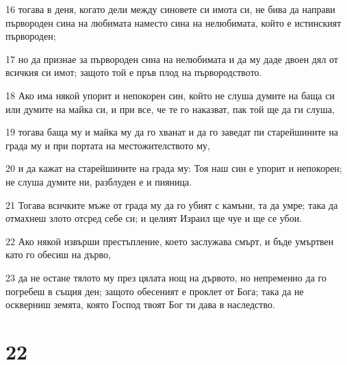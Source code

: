 \par 16 тогава в деня, когато дели между синовете си имота си, не бива да направи първороден сина на любимата наместо сина на нелюбимата, който е истинският първороден;
\par 17 но да признае за първороден сина на нелюбимата и да му даде двоен дял от всичкия си имот; защото той е пръв плод на първородството.
\par 18 Ако има някой упорит и непокорен син, който не слуша думите на баща си или думите на майка си, и при все, че те го наказват, пак той ще да ги слуша,
\par 19 тогава баща му и майка му да го хванат и да го заведат пи старейшините на града му и при портата на местожителството му,
\par 20 и да кажат на старейшините на града му: Тоя наш син е упорит и непокорен; не слуша думите ни, разблуден е и пияница.
\par 21 Тогава всичките мъже от града му да го убият с камъни, та да умре; така да отмахнеш злото отсред себе си; и целият Израил ще чуе и ще се убои.
\par 22 Ако някой извърши престъпление, което заслужава смърт, и бъде умъртвен като го обесиш на дърво,
\par 23 да не остане тялото му през цялата нощ на дървото, но непременно да го погребеш в същия ден; защото обесеният е проклет от Бога; така да не оскверниш земята, която Господ твоят Бог ти дава в наследство.

\chapter{22}

